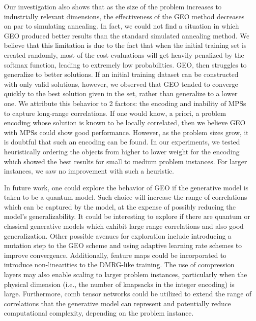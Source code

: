 Our investigation also shows that as the size of the problem increases to industrially relevant dimensions, the effectiveness of the GEO method decreases on par to simulating annealing. In fact, we could not find a situation in which GEO produced better results than the standard simulated annealing method. We believe that this limitation is due to the fact that when the initial training set is created randomly, most of the cost evaluations will get heavily penalized by the softmax function, leading to extremely low probabilities. GEO, then struggles to generalize to better solutions. If an initial training dataset can be constructed with only valid solutions, however, we observed that GEO tended to converge quickly to the best solution given in the set, rather than generalize to a lower one. We attribute this behavior to 2 factors: the encoding and inability of MPSs to capture long-range correlations. If one would know, a priori, a problem encoding whose solution is known to be locally correlated, then we believe GEO with MPSs could show good performance. However, as the problem sizes grow, it is doubtful that such an encoding can be found. In our experiments, we tested heuristically ordering the objects from higher to lower weight for the encoding which showed the best results for small to medium problem instances. For larger instances, we saw no improvement with such a heuristic.

In future work, one could explore the behavior of GEO if the generative model is taken to be a quantum model. Such choice will increase the range of correlations which can be captured by the model, at the expense of possibly reducing the model's generalizability. It could be interesting to explore if there are quantum or classical generative models which exhibit large range correlations and also good generalization. Other possible avenues for exploration include introducing a mutation step to the GEO scheme \cite{gardiner2024} and using adaptive learning rate schemes to improve convergence. Additionally, feature maps \cite{stoudenmire2017supervisedlearningquantuminspiredtensor} could be incorporated to introduce non-linearities to the DMRG-like training. The use of compression layers \cite{meiburg2024generativelearningcontinuousdata} may also enable scaling to larger problem instances, particularly when the physical dimension (i.e., the number of knapsacks in the integer encoding) is large. Furthermore, comb tensor networks \cite{Chepiga_2019} could be utilized to extend the range of correlations that the generative model can represent and potentially reduce computational complexity, depending on the problem instance.

